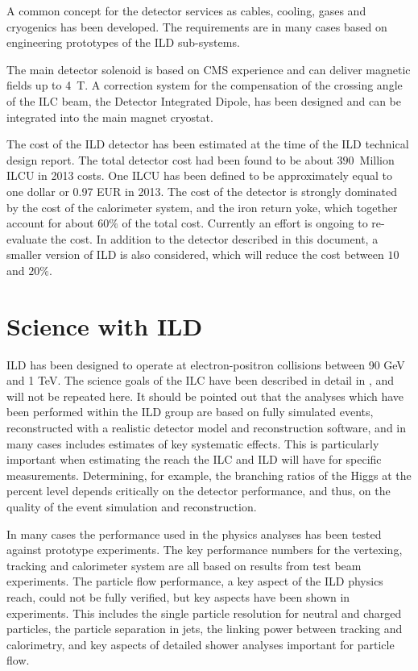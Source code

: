 \documentclass[%
 amsmath,amssymb,
 aps,
]{revtex4-1}
\begin{document}
A common concept for the detector services as cables, cooling, gases and cryogenics has been developed. The requirements are in many cases based on engineering prototypes of the ILD sub-systems. 

The main detector solenoid is based on CMS experience and can deliver magnetic fields up to 4~T. A correction system for the compensation of the crossing angle of the ILC beam, the Detector Integrated Dipole, has been designed and can be integrated into the main magnet cryostat.

The cost of the ILD detector has been estimated at the time of the ILD technical design report. The total detector cost had been found to be about $390$~Million ILCU in 2013 costs. One ILCU has been defined to be approximately equal to one dollar or 0.97 EUR in 2013. The cost of the detector is strongly dominated by the cost of the calorimeter system, and the iron return yoke, which together account for about $60\%$ of the total cost. Currently an effort is ongoing to re-evaluate the cost. In addition to the detector described in this document, a smaller version of ILD is also considered, which will reduce the cost between $10$ and $20\%$. 

\section{Science with ILD}
ILD has been designed to operate at electron-positron collisions between 90 GeV and 1 TeV. The science goals of the ILC have been described in detail in \cite{ILCESU1}, and will not be repeated here. It should be pointed out that the analyses which have been performed within the ILD group are based on fully simulated events, reconstructed with a realistic detector model and reconstruction software, and in many cases includes estimates of key systematic effects. This is particularly important when estimating the reach the ILC and ILD will have for specific measurements. Determining, for example, the branching ratios of the Higgs at the percent level depends critically on the detector performance, and thus, on the quality of the event simulation and reconstruction. 

In many cases the performance used in the physics analyses has been tested against prototype experiments. The key performance numbers for the vertexing, tracking and calorimeter system are all based on results from test beam experiments. The particle flow performance, a key aspect of the ILD physics reach, could not be fully verified, but key aspects have been shown in experiments. This includes the single particle resolution for neutral and charged particles, the particle separation in jets, the linking power between tracking and calorimetry, and key aspects of detailed shower analyses important for particle flow. 
\end{document}
